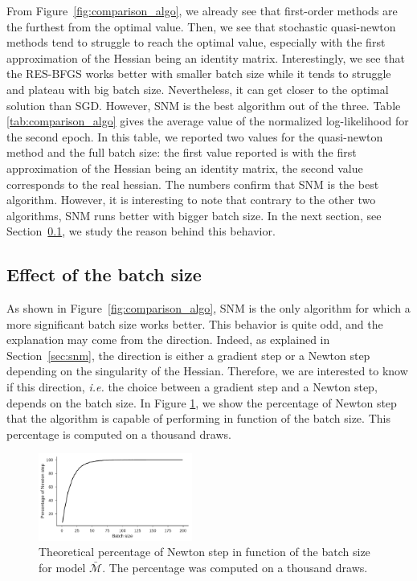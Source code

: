 \documentclass[conference]{IEEEtran}
\begin{document}
From Figure~\ref{fig:comparison_algo}, we already see that first-order methods are the furthest from the optimal value. Then, we see that stochastic quasi-newton methods tend to struggle to reach the optimal value, especially with the first approximation of the Hessian being an identity matrix. Interestingly, we see that the RES-BFGS works better with smaller batch size while it tends to struggle and plateau with big batch size. Nevertheless, it can get closer to the optimal solution than SGD. However, SNM is the best algorithm out of the three. Table \ref{tab:comparison_algo} gives the average value of the normalized log-likelihood for the second epoch. In this table, we reported two values for the quasi-newton method and the full batch size: the first value reported is with the first approximation of the Hessian being an identity matrix, the second value corresponds to the real hessian. The numbers confirm that SNM is the best algorithm. However, it is interesting to note that contrary to the other two algorithms, SNM runs better with bigger batch size. In the next section, see Section~\ref{sec:effect_bs}, we study the reason behind this behavior.

\subsection{Effect of the batch size}
\label{sec:effect_bs}

As shown in Figure~\ref{fig:comparison_algo}, SNM is the only algorithm for which a more significant batch size works better. This behavior is quite odd, and the explanation may come from the direction. Indeed, as explained in Section~\ref{sec:snm}, the direction is either a gradient step or a Newton step depending on the singularity of the Hessian. Therefore, we are interested to know if this direction, {\it i.e.} the choice between a gradient step and a Newton step, depends on the batch size. In Figure \ref{fig:perc_newton}, we show the percentage of Newton step that the algorithm is capable of performing in function of the batch size. This percentage is computed on a thousand draws. \\

\begin{figure}[t]
\centering
\includegraphics[width=0.45\textwidth]{../figures/perc_newton.pdf}
\vspace{-0.3cm}
\caption{Theoretical percentage of Newton step in function of the batch size for model $\bar{\mathcal{M}}$. The percentage was computed on a thousand draws.}
\label{fig:perc_newton}
\vspace{-0.3cm}
\end{figure}
\end{document}
